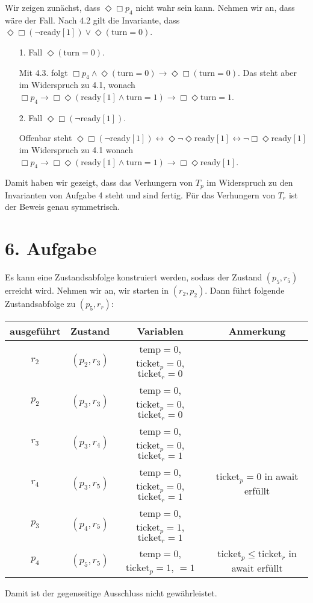 \documentclass[numbers=noendperiod]{scrartcl}
\begin{document}
Wir zeigen zunächst, dass $\Diamond \Box p_4$ nicht wahr sein kann. Nehmen wir an, dass wäre der Fall. Nach 4.2 gilt die Invariante, dass $\Diamond \Box (\lnot \text{ready}[1]) \lor \Diamond (\text{turn} = 0)$. 
\begin{enumerate}
	\item[1. Fall] $\Diamond (\text{turn} = 0)$.
	
	Mit 4.3. folgt $\Box p_4 \land \Diamond (\text{turn} = 0) \rightarrow \Diamond \Box (\text{turn} = 0)$. Das steht aber im Widerspruch zu 4.1, wonach $\Box p_4 \rightarrow \Box \Diamond (\text{ready}[1] \land \text{turn} = 1) \rightarrow \Box \Diamond \text{turn} = 1$.
	
	\item[2. Fall] $\Diamond\Box (\lnot \text{ready}[1])$.
	
	Offenbar steht $\Diamond \Box (\lnot \text{ready}[1]) \leftrightarrow \Diamond \lnot \Diamond \text{ready}[1] \leftrightarrow \lnot \Box \Diamond \text{ready}[1]$ im Widerspruch zu 4.1 wonach $\Box p_4 \rightarrow \Box \Diamond (\text{ready}[1] \land \text{turn} = 1) \rightarrow \Box \Diamond \text{ready}[1]$.
\end{enumerate}

Damit haben wir gezeigt, dass das Verhungern von $T_p$ im Widerspruch zu den Invarianten von Aufgabe 4 steht und sind fertig. Für das Verhungern von $T_r$ ist der Beweis genau symmetrisch.

\section*{6. Aufgabe}

Es kann eine Zustandsabfolge konstruiert werden, sodass der Zustand $(p_5,r_5)$ erreicht wird. Nehmen wir an, wir starten in $(r_2,p_2)$. Dann führt folgende Zustandsabfolge zu $(p_5,r_r)$:

\begin{table}[h]
	\begin{tabular}{c|c|c|c}
		ausgeführt & Zustand & Variablen & Anmerkung\\\hline
		$r_2$ & $(p_2,r_3)$ & $\text{temp} = 0$, $\text{ticket}_p = 0$, $\text{ticket}_r = 0$ &\\
		$p_2$ & $(p_3,r_3)$ & $\text{temp} = 0$, $\text{ticket}_p = 0$, $\text{ticket}_r = 0$ &\\
		$r_3$ & $(p_3,r_4)$ & $\text{temp} = 0$, $\text{ticket}_p = 0$, $\text{ticket}_r = 1$ &\\
		$r_4$ & $(p_3,r_5)$ & $\text{temp} = 0$, $\text{ticket}_p = 0$, $\text{ticket}_r = 1$ & $\text{ticket}_p = 0$ in await erfüllt \\
		$p_3$ & $(p_4,r_5)$ & $\text{temp} = 0$, $\text{ticket}_p = 1$, $\text{ticket}_r = 1$ &\\
		$p_4$ & $(p_5,r_5)$ & $\text{temp} = 0$, $\text{ticket}_p = 1$, $ = 1$ & $\text{ticket}_p \le \text{ticket}_r$ in await erfüllt\\
	\end{tabular}
\end{table}

Damit ist der gegenseitige Ausschluss nicht gewährleistet.
\end{document}
